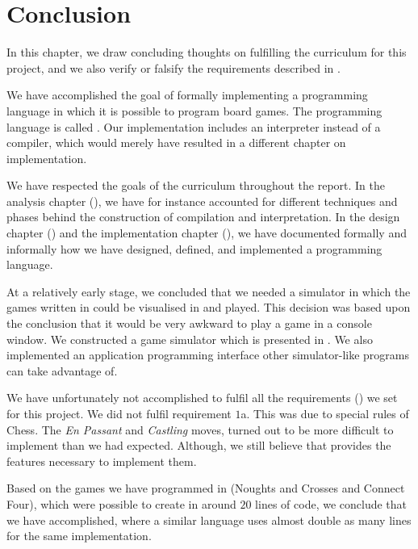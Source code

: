 \chapter{Conclusion}
\label{chap:conclusion}

In this chapter, we draw concluding thoughts on fulfilling the
curriculum for this project, and we also verify or falsify the
requirements described in .

We have accomplished the goal of formally implementing a programming
language in which it is possible to program board games. The programming
language is called \productname{}. Our implementation includes an
interpreter instead of a compiler, which would merely have resulted in a
different chapter on implementation.

We have respected the goals of the curriculum throughout the
report. In the analysis chapter (), we
have for instance accounted for different techniques and phases behind the
construction of compilation and interpretation. In the design
chapter () and the implementation chapter
(), we have documented formally and
informally how we have designed, defined, and implemented a programming
language.

At a relatively early stage, we concluded that we needed a simulator
in which the games written in \productname{} could be visualised in
and played. This decision was based upon the conclusion that it would
be very awkward to play a game in a console window. We constructed a
game simulator which is presented in . We also
implemented an application programming interface other simulator-like
programs can take advantage of.

We have unfortunately not accomplished to fulfil all the requirements 
() we set for this project. We did not
fulfil requirement $1$a. This was due to special rules of Chess.
The \textit{En Passant} and \textit{Castling} moves, turned out to be more
difficult to implement than we had expected. Although, we still believe that
\productname{} provides the features necessary to implement them.

Based on the games we have programmed in \productname{} (Noughts and
Crosses and Connect Four), which were possible to create in around $20$
lines of code, we conclude that we have accomplished, where a similar
language uses almost double as many lines for the same implementation.

